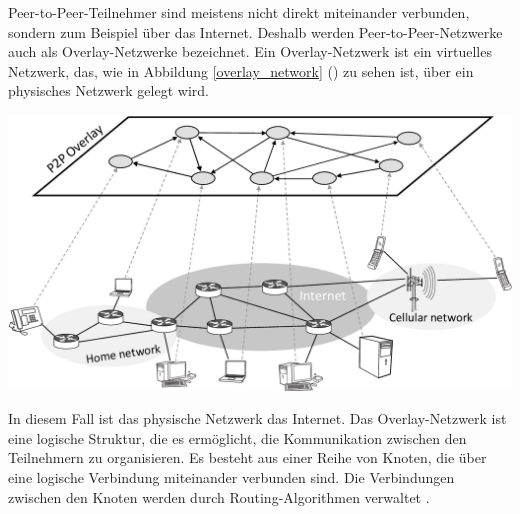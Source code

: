 Peer-to-Peer-Teilnehmer sind meistens nicht direkt miteinander verbunden, sondern zum Beispiel über das Internet. Deshalb werden Peer-to-Peer-Netzwerke auch als Overlay-Netzwerke bezeichnet. Ein Overlay-Netzwerk ist ein virtuelles Netzwerk, das, wie in Abbildung \ref{overlay_network} (\textit{}) zu sehen ist, über ein physisches Netzwerk gelegt wird.

\begin{center}
    \captionsetup{type=figure}
    \includegraphics[width=0.9\linewidth]{images/overlay_network.png}
    \label{overlay_network}
\end{center}

\noindent In diesem Fall ist das physische Netzwerk das Internet. Das Overlay-Netzwerk ist eine logische Struktur, die es ermöglicht, die Kommunikation zwischen den Teilnehmern zu organisieren. Es besteht aus einer Reihe von Knoten, die über eine logische Verbindung miteinander verbunden sind. Die Verbindungen zwischen den Knoten werden durch Routing-Algorithmen verwaltet \parencite{Lua_P2POverlayNetworksPaper}.

